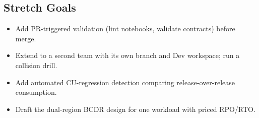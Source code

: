 \subsection*{Stretch Goals}
\begin{itemize}
    \item Add PR-triggered validation (lint notebooks, validate contracts) before merge.
    \item Extend to a second team with its own branch and Dev workspace; run a collision drill.
    \item Add automated CU-regression detection comparing release-over-release consumption.
    \item Draft the dual-region BCDR design for one workload with priced RPO/RTO.
\end{itemize}
